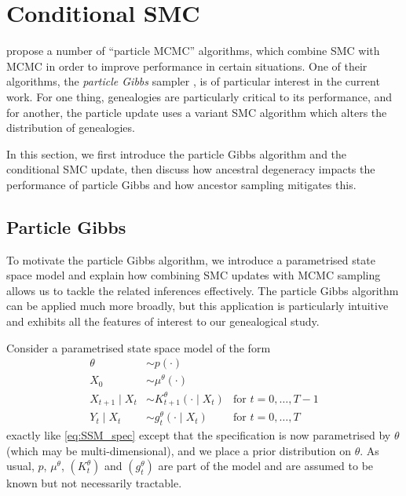 \section{Conditional SMC}
\label{sec:condSMC}
\textcite{andrieu2010} propose a number of ``particle MCMC'' algorithms, which combine SMC with MCMC in order to improve performance in certain situations.
One of their algorithms, the \emph{particle Gibbs} sampler \parencite[Section 2.4.3]{andrieu2010}, is of particular interest in the current work. For one thing, genealogies are particularly critical to its performance, and for another, the particle update uses a variant SMC algorithm which alters the distribution of genealogies.

In this section, we first introduce the particle Gibbs algorithm and the conditional SMC update, then discuss how ancestral degeneracy impacts the performance of particle Gibbs and how ancestor sampling mitigates this.




\subsection{Particle Gibbs}
\label{sec:particleGibbs}
To motivate the particle Gibbs algorithm, we introduce a parametrised state space model and explain how combining SMC updates with MCMC sampling allows us to tackle the related inferences effectively.
The particle Gibbs algorithm can be applied much more broadly, but this application is particularly intuitive and exhibits all the features of interest to our genealogical study.

Consider a parametrised state space model of the form
\begin{align*}
\theta &\sim p(\cdot) & \\
X_0 &\sim \mu^\theta(\cdot) & \\
X_{t+1} \mid X_{t} &\sim K_{t+1}^\theta(\cdot \mid X_{t}) &\text{for } t=0,\dots, T-1 \\
Y_t \mid X_t &\sim g_t^\theta(\cdot \mid X_t) &\text{for } t=0,\dots, T
\end{align*}
exactly like \eqref{eq:SSM_spec} except that the specification is now parametrised by $\theta$ (which may be multi-dimensional), and we place a prior distribution on $\theta$. 
As usual, $p$, $\mu^\theta$, $(K_t^\theta)$ and $(g_t^\theta)$ are part of the model and are assumed to be known but not necessarily tractable.

